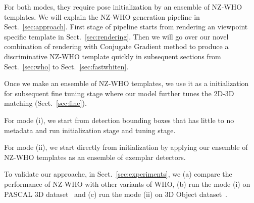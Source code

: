 For both modes, they require pose initialization by an ensemble of NZ-WHO templates. We will explain the NZ-WHO generation pipeline in Sect.~\ref{sec:approach}. First stage of pipeline starts from rendering an viewpoint specific template in Sect.~\ref{sec:rendering}. Then we will go over our novel combination of rendering with Conjugate Gradient method to produce a discriminative NZ-WHO template quickly in subsequent sections from Sect.~\ref{sec:who} to Sect.~\ref{sec:fastwhiten}. 

Once we make an ensemble of NZ-WHO templates, we use it as a initialization for subsequent fine tuning stage where our model further tunes the 2D-3D matching (Sect.~\ref{sec:fine}).

For mode (i), we start from detection bounding boxes that has little to no metadata and run initialization stage and tuning stage.

For mode (ii), we start directly from initialization by applying our ensemble of NZ-WHO templates as an ensemble of exemplar detectors.

To validate our approache, in Sect.~\ref{sec:experiments}, we (a) compare the performance of NZ-WHO with other variants of WHO, (b) run the mode (i) on PASCAL 3D dataset~\cite{Xiang14} and (c) run the mode (ii) on 3D Object dataset~\cite{Savarese07}.







